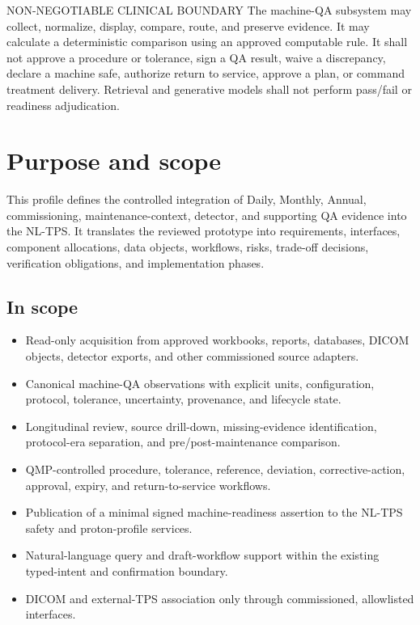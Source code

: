 \documentclass[11pt,letterpaper]{article}
\begin{document}
\begin{nlnotice}{NON-NEGOTIABLE CLINICAL BOUNDARY}
The machine-QA subsystem may collect, normalize, display, compare, route, and preserve evidence. It may calculate a deterministic comparison using an approved computable rule. It shall not approve a procedure or tolerance, sign a QA result, waive a discrepancy, declare a machine safe, authorize return to service, approve a plan, or command treatment delivery. Retrieval and generative models shall not perform pass/fail or readiness adjudication.
\end{nlnotice}

\section{Purpose and scope}

This profile defines the controlled integration of Daily, Monthly, Annual, commissioning, maintenance-context, detector, and supporting QA evidence into the NL-TPS. It translates the reviewed prototype into requirements, interfaces, component allocations, data objects, workflows, risks, trade-off decisions, verification obligations, and implementation phases.

\subsection{In scope}

\begin{itemize}
\item Read-only acquisition from approved workbooks, reports, databases, DICOM objects, detector exports, and other commissioned source adapters.
\item Canonical machine-QA observations with explicit units, configuration, protocol, tolerance, uncertainty, provenance, and lifecycle state.
\item Longitudinal review, source drill-down, missing-evidence identification, protocol-era separation, and pre/post-maintenance comparison.
\item QMP-controlled procedure, tolerance, reference, deviation, corrective-action, approval, expiry, and return-to-service workflows.
\item Publication of a minimal signed machine-readiness assertion to the NL-TPS safety and proton-profile services.
\item Natural-language query and draft-workflow support within the existing typed-intent and confirmation boundary.
\item DICOM and external-TPS association only through commissioned, allowlisted interfaces.
\end{itemize}
\end{document}
